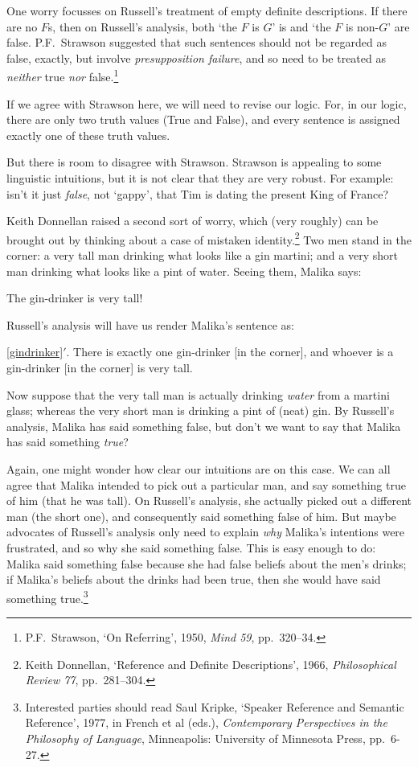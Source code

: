 One worry focusses on Russell's treatment of empty definite descriptions. If there are no $F$s, then on Russell's analysis, both `the $F$ is $G$' is and  `the $F$ is non-$G$' are false. P.F.\ Strawson suggested that such sentences should not be regarded as false, exactly, but involve \emph{presupposition failure}, and so need to be treated as \emph{neither} true \emph{nor} false.\footnote{P.F.\ Strawson, `On Referring', 1950, \emph{Mind 59}, pp.\ 320--34.}

If we agree with Strawson here, we will need to revise our logic. For, in our logic, there are only two truth values (True and False), and every sentence is assigned exactly one of these truth values. 

But there is room to disagree with Strawson. Strawson is appealing to some linguistic intuitions, but it is not clear that they are very robust. For example: isn't it just \emph{false}, not `gappy', that Tim is dating the present King of France?

Keith Donnellan raised a second sort of worry, which (very roughly) can be brought out by thinking about a case of mistaken identity.\footnote{Keith Donnellan, `Reference and Definite Descriptions', 1966, \emph{Philosophical Review 77}, pp.\ 281--304.} Two men stand in the corner: a very tall man drinking what looks like a gin martini; and a very short man drinking what looks like a pint of water. Seeing them, Malika says:
	\begin{earg}
		\item[\ex{gindrinker}] The gin-drinker is very tall!
	\end{earg}
Russell's analysis will have us render Malika's sentence as:
	\begin{earg}
		\item[\ref{gindrinker}$'$.] There is exactly one gin-drinker [in the corner], and whoever is a gin-drinker [in the corner] is very tall.
	\end{earg}
Now suppose that the very tall man is actually drinking \emph{water} from a martini glass; whereas the very short man is drinking a pint of (neat) gin. By Russell's analysis, Malika has said something false, but don't we want to say that Malika has said something \emph{true}? 

Again, one might wonder how clear our intuitions are on this case. We can all agree that Malika intended to pick out a particular man, and say something true of him (that he was tall). On Russell's analysis, she actually picked out a different man (the short one), and consequently said something false of him. But  maybe advocates of Russell's analysis only need to explain \emph{why} Malika's intentions were frustrated, and so why she said something false. This is easy enough to do:  Malika said something false because she had false beliefs about the men's drinks; if Malika's beliefs about the drinks had been true,  then she would have said something true.\footnote{Interested parties should read Saul Kripke, `Speaker Reference and Semantic Reference', 1977, in French et al (eds.), \emph{Contemporary Perspectives in the Philosophy of Language}, Minneapolis: University of Minnesota Press, pp.\ 6-27.}

